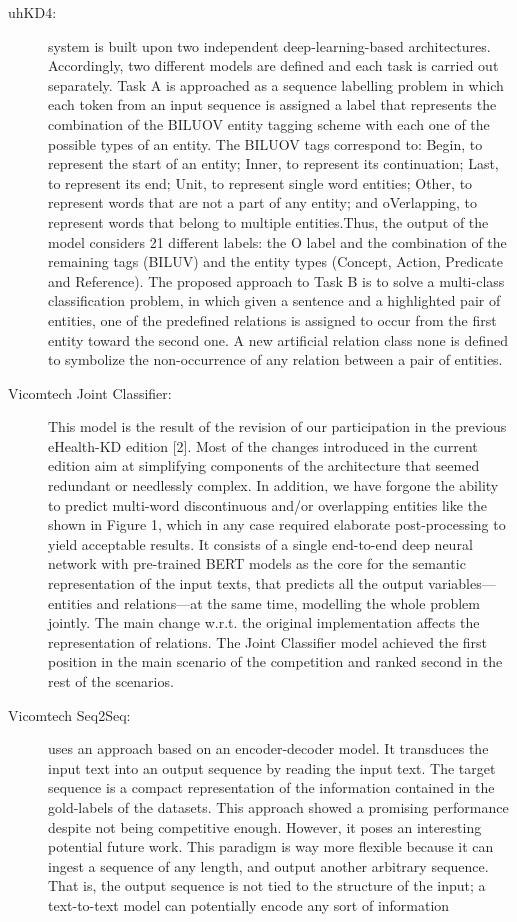 \documentclass[a4paper,11pt,twocolumn,twoside]{article}
\begin{document}
\begin{description}
  \item[uhKD4:]  system is built upon two independent deep-learning-based architectures. Accordingly, two
  different models are defined and each task is carried out separately. Task A is approached as a
  sequence labelling problem in which each token from an input sequence is assigned a label that
  represents the combination of the BILUOV entity tagging scheme with each one of the possible
  types of an entity. The BILUOV tags correspond to: Begin, to represent the start of an entity;
  Inner, to represent its continuation; Last, to represent its end; Unit, to represent single word
  entities; Other, to represent words that are not a part of any entity; and oVerlapping, to represent
  words that belong to multiple entities.Thus, the output of the model considers 21 different labels: the
  O label and the combination of the remaining tags (BILUV) and the entity types (Concept,
  Action, Predicate and Reference). The proposed approach to Task B is to solve a multi-class
  classification problem, in which given a sentence and a highlighted pair of entities, one of the
  predefined relations is assigned to occur from the first entity toward the second one. A new
  artificial relation class none is defined to symbolize the non-occurrence of any relation between
  a pair of entities.

  \item[Vicomtech Joint Classifier:] This model is the result of the revision of our participation in the previous eHealth-KD edition
  [2]. Most of the changes introduced in the current edition aim at simplifying components of
  the architecture that seemed redundant or needlessly complex. In addition, we have forgone
  the ability to predict multi-word discontinuous and/or overlapping entities like the shown in
  Figure 1, which in any case required elaborate post-processing to yield acceptable results.
  It consists of a single end-to-end deep neural network with
  pre-trained BERT models as the core for the semantic representation of the input texts, that predicts all
  the output variables—entities and relations—at the same time, modelling the whole problem jointly.
  The main change w.r.t. the original implementation affects the representation of relations. The Joint
  Classifier model achieved the first position in the main scenario of the competition and ranked second
  in the rest of the scenarios.

  \item[Vicomtech  Seq2Seq:] uses an approach based on an
  encoder-decoder model. It transduces the input text into an output sequence by reading the input text.
  The target sequence is a compact representation of the information contained in the gold-labels of
  the datasets. This approach showed a promising performance despite not being competitive enough.
  However, it poses an interesting potential future work.
  This paradigm is way more flexible because it can ingest a sequence of any length,
  and output another arbitrary sequence. That is, the output sequence is not tied to the structure
  of the input; a text-to-text model can potentially encode any sort of information


\end{description}
\end{document}
